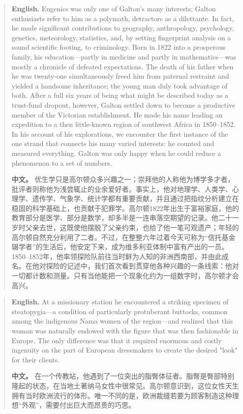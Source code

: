 \begin{quote}
\noindent\textbf{English.} Eugenics was only one of Galton's many interests; Galton enthusiasts refer to him as a polymath, detractors as a dilettante. In fact, he made significant contributions to geography, anthropology, psychology, genetics, meteorology, statistics, and, by setting fingerprint analysis on a sound scientific footing, to criminology. Born in 1822 into a prosperous family, his education---partly in medicine and partly in mathematics---was mostly a chronicle of defeated expectations. The death of his father when he was twenty-one simultaneously freed him from paternal restraint and yielded a handsome inheritance; the young man duly took advantage of both. After a full six years of being what might be described today as a trust-fund dropout, however, Galton settled down to become a productive member of the Victorian establishment. He made his name leading an expedition to a then little-known region of southwest Africa in 1850--1852. In his account of his explorations, we encounter the first instance of the one strand that connects his many varied interests: he counted and measured everything. Galton was only happy when he could reduce a phenomenon to a set of numbers.

\smallskip
\noindent\textbf{中文。} 优生学只是高尔顿众多兴趣之一；崇拜他的人称他为博学多才者，批评者则称他为浅尝辄止的业余爱好者。事实上，他对地理学、人类学、心理学、遗传学、气象学、统计学都有重要贡献，并且通过把指纹分析建立在稳固的科学基础上，也贡献于犯罪学。高尔顿1822年出生于富裕家庭，他的教育部分是医学、部分是数学，却多半是一连串落空期望的记录。他二十一岁时父亲去世，这既使他摆脱了父亲约束，也给了他一笔可观遗产；年轻的高尔顿自然充分利用了二者。不过，在整整六年过着今天可称为“信托基金辍学者”的生活后，他安定下来，成为维多利亚体制中富有产出的一员。1850--1852年，他率领探险队前往当时鲜为人知的非洲西南部，并由此成名。在他对探险的记述中，我们首次看到贯穿他各种兴趣的一条线索：他对一切都计数和测量。只有当他能把一个现象化约为一组数字时，高尔顿才会高兴。
\end{quote}

\begin{quote}
\noindent\textbf{English.} At a missionary station he encountered a striking specimen of steatopygia---a condition of particularly protuberant buttocks, common among the indigenous Nama women of the region---and realized that this woman was naturally endowed with the figure that was then fashionable in Europe. The only difference was that it required enormous and costly ingenuity on the part of European dressmakers to create the desired "look" for their clients.

\smallskip
\noindent\textbf{中文。} 在一个传教站，他遇到了一位突出的脂臀体征者。脂臀是臀部特别隆起的状态，在当地土著纳马女性中很常见。高尔顿意识到，这位女性天生拥有当时欧洲流行的体形。唯一不同的是，欧洲裁缝若要为顾客制造这种理想“外观”，需要付出巨大而昂贵的巧思。
\end{quote}

